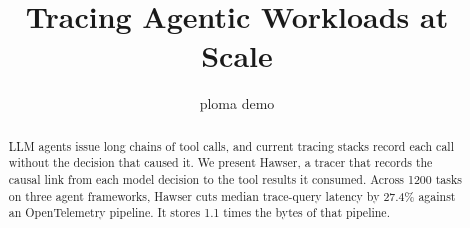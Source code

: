 \documentclass[11pt]{article}
\title{Tracing Agentic Workloads at Scale}
\author{ploma demo}
\date{}
\begin{document}
\maketitle

\begin{abstract}
LLM agents issue long chains of tool calls, and current tracing stacks record each call without the decision that caused it.
We present Hawser, a tracer that records the causal link from each model decision to the tool results it consumed.
Across 1200 tasks on three agent frameworks, Hawser cuts median trace-query latency by 27.4\% against an OpenTelemetry pipeline.
It stores 1.1 times the bytes of that pipeline.
\end{abstract}







\end{document}
